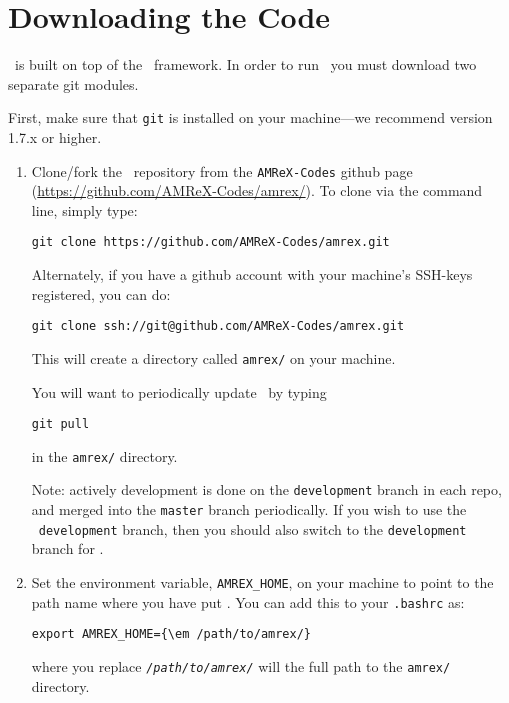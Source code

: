
\section{Downloading the Code}

\castro\ is built on top of the \amrex\ framework.  In order to run
\castro\, you must download two separate git modules.

\vspace{.1in}

\noindent First, make sure that {\tt git} is installed on your machine---we recommend version 1.7.x or higher.

\vspace{.1in}

\begin{enumerate}

\item Clone/fork the \amrex\ repository from the {\tt AMReX-Codes} {\sf
  github} page (\url{https://github.com/AMReX-Codes/amrex/}).  To
  clone via the command line, simply type:
\begin{verbatim}
git clone https://github.com/AMReX-Codes/amrex.git
\end{verbatim}
Alternately, if you have a {\sf github} account with your
machine's SSH-keys registered, you can do:
\begin{verbatim}
git clone ssh://git@github.com/AMReX-Codes/amrex.git
\end{verbatim}

This will create a directory called {\tt amrex/} on your machine.

You will want to periodically update \amrex\ by typing
\begin{verbatim}
git pull
\end{verbatim}
in the {\tt amrex/} directory.  

Note: actively development is done on the {\tt development} branch
in each repo, and merged into the {\tt master} branch periodically.
If you wish to use the \castro\ {\tt development} branch, then you
should also switch to the {\tt development} branch for \amrex.

\item Set the environment variable, {\tt AMREX\_HOME}, on your
  machine to point to the path name where you have put \amrex.
  You can add this to your {\tt .bashrc} as:
\begin{Verbatim}[commandchars=\\\{\}]
export AMREX_HOME={\em /path/to/amrex/}
\end{Verbatim}
where you replace \texttt{\em /path/to/amrex/} will the full path to the
{\tt amrex/} directory.


\end{enumerate}
